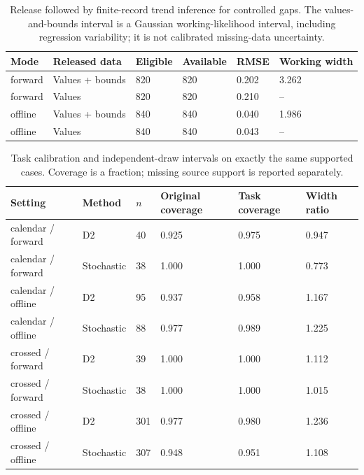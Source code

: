 \begin{table}[p]\centering\small
\caption{Release followed by finite-record trend inference for controlled gaps. The values-and-bounds interval is a Gaussian working-likelihood interval, including regression variability; it is not calibrated missing-data uncertainty.}\label{tab:release-then-trend}
\begin{tabular}{llllll}
\toprule
Mode & Released data & Eligible & Available & RMSE & Working width\\\midrule
forward & Values + bounds & 820 & 820 & 0.202 & 3.262\\
forward & Values & 820 & 820 & 0.210 & --\\
offline & Values + bounds & 840 & 840 & 0.040 & 1.986\\
offline & Values & 840 & 840 & 0.043 & --\\
\bottomrule\end{tabular}
\end{table}
\begin{table}[p]\centering\small
\caption{Task calibration and independent-draw intervals on exactly the same supported cases. Coverage is a fraction; missing source support is reported separately.}\label{tab:task-calibration}
\begin{tabular}{llllll}
\toprule
Setting & Method & $n$ & Original coverage & Task coverage & Width ratio\\\midrule
calendar / forward & D2 & 40 & 0.925 & 0.975 & 0.947\\
calendar / forward & Stochastic & 38 & 1.000 & 1.000 & 0.773\\
calendar / offline & D2 & 95 & 0.937 & 0.958 & 1.167\\
calendar / offline & Stochastic & 88 & 0.977 & 0.989 & 1.225\\
crossed / forward & D2 & 39 & 1.000 & 1.000 & 1.112\\
crossed / forward & Stochastic & 38 & 1.000 & 1.000 & 1.015\\
crossed / offline & D2 & 301 & 0.977 & 0.980 & 1.236\\
crossed / offline & Stochastic & 307 & 0.948 & 0.951 & 1.108\\
\bottomrule\end{tabular}
\end{table}
